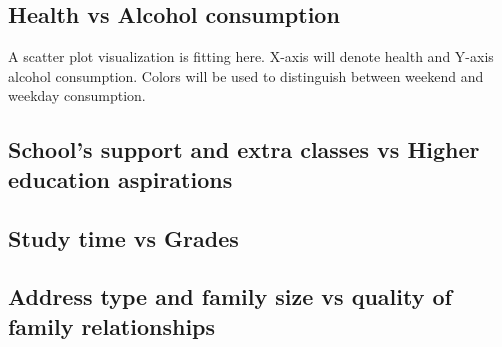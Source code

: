 \documentclass[titlepage, 12pt]{article}
\begin{document}
\subsection{Health vs Alcohol consumption}
A scatter plot visualization is fitting here. X-axis will denote health and
Y-axis alcohol consumption. Colors will be used to distinguish between weekend
and weekday consumption.

\subsection{School's support and extra classes vs Higher
education aspirations}

\subsection{Study time vs Grades}

\subsection{Address type and family size vs quality of family relationships}
\end{document}
